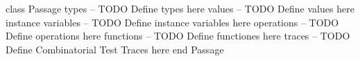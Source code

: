 \begin{vdmpp}[breaklines=true]
class Passage
types
-- TODO Define types here
values
-- TODO Define values here
instance variables
-- TODO Define instance variables here
operations
-- TODO Define operations here
functions
-- TODO Define functiones here
traces
-- TODO Define Combinatorial Test Traces here
end Passage
\end{vdmpp}
